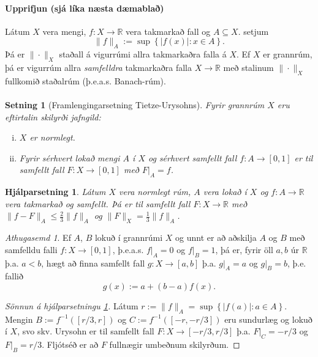 \documentclass[a4paper,icelandic]{book}
\theoremstyle{definition}
\theoremstyle{plain}
\newtheorem{setn}{Setning}[section]
\newtheorem{hjalparsetn}{Hjálparsetning}[section]
\theoremstyle{remark}
\newtheorem*{ath}{Athugasemd}
\newcommand{\R}{\mathbb{R}} %
\begin{document}
\paragraph{Upprifjun \textnormal{(sjá líka næsta dæmablað)}}
Látum $X$ vera mengi, $f:X\to \R$ vera takmarkað fall og $A\subseteq X$.
setjum \[
\| f \|_A := \sup\left\{ |f(x)| : x\in A \right\}.
\]
Þá er $\|\cdot\|_X$ staðall á vigurrúmi allra takmarkaðra falla á $X$.
Ef $X$ er grannrúm, þá er vigurrúm allra \emph{samfelldra} takmarkaðra
falla $X\to\R$ með stalinum $\|\cdot\|_X$ fullkomið staðalrúm (þ.e.a.s.
Banach-rúm).

\paragraph{}
\begin{setn}
  [Framlengingarsetning
  Tietze-Urysohns]
  Fyrir grannrúm $X$ eru eftirtalin skilyrði jafngild:
  \begin{enumerate}[(i)]
    \item $X$ er normlegt.
    \item Fyrir sérhvert lokað mengi $A$ í $X$ og sérhvert samfellt fall
      $f:A\to\left[ 0,1 \right]$ er til samfellt fall $F:X\to\left[ 0,1
      \right]$ með $F|_A = f$. 
  \end{enumerate}
\end{setn}
\begin{hjalparsetn}\label{hjalp:urysohn.1}
  Látum $X$ vera normlegt rúm, $A$ vera lokað í $X$ og $f:A\to\R$ vera
  takmarkað og samfellt. Þá er til samfellt fall $F:X\to\R$ með
  $\|f-F\|_A\leq \frac 23 \|f\|_A$ og $\|F\|_X = \frac 13\|f\|_A$.
\end{hjalparsetn}
\begin{ath}
  Ef $A$, $B$ lokuð í grannrúmi $X$ og unnt er að aðskilja $A$ og $B$
  með samfelldu falli $f:X\to\left[ 0,1 \right]$, þ.e.a.s. $f|_A = 0$ og
  $f|_B = 1$, þá er, fyrir öll $a,b$ úr $\R$ þ.a. $a<b$, hægt að finna
  samfellt fall $g:X\to\left[ a,b \right]$ þ.a. $g|_A = a$ og $g|_B =
  b$, þ.e. fallið\[
  g(x) := a + (b-a)f(x).
  \]
\end{ath}
\begin{proof}
  [Sönnun á hjálparsetningu \ref{hjalp:urysohn.1}]
  Látum $r := \|f\|_A = \sup\left\{ |f(a)|:a\in A \right\}$. Mengin
  $B:=f^{-1}(\left[ r/3,r \right])$ og $C:=f^{-1}(\left[-r,-r/3\right])$
  eru sundurlæg og lokuð í $X$, svo skv. Urysohn er til samfellt fall
  $F:X\to\left[-r/3,r/3\right]$ þ.a. $F|_C=-r/3$ og $F|_B=r/3$. Fljótséð
  er að $F$ fullnægir umbeðnum skilyrðum.
\end{proof}
\end{document}
